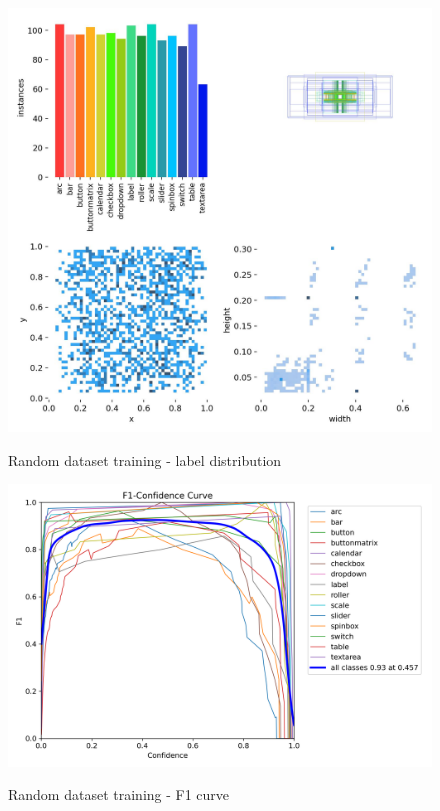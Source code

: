 \documentclass[Bachelor, BIC, english, fhCitStyle, IEEE]{BASE/twbook} %
\begin{document}
\begin{figure}
    \caption{Random dataset training - label distribution}
    \centering
    \includegraphics[width=\textwidth]{PICs/train371/labels.jpg}
    \label{fig:random-training-labels}
\end{figure}
\begin{figure}
    \caption{Random dataset training - F1 curve}
    \centering
    \includegraphics[width=\textwidth]{PICs/train371/F1_curve.png}
    \label{fig:random-training-f1}
\end{figure}
\end{document}
